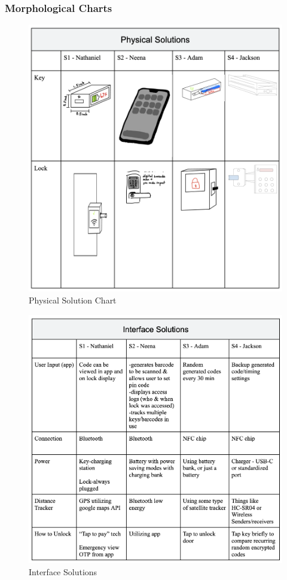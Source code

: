 
\subsubsection{Morphological Charts}

\begin{figure}[!ht]
    \centering
    \includegraphics[width=1\linewidth]{./img/p1mm.png}
    \caption{Physical Solution Chart}
    \label{fig:p1mm}
\end{figure}
\newpage
\begin{figure}[!ht]
    \centering
    \includegraphics[width=1\linewidth]{./img/p2mm.png}
    \caption{Interface Solutions}
    \label{fig:p2mm}
\end{figure}
\newpage

